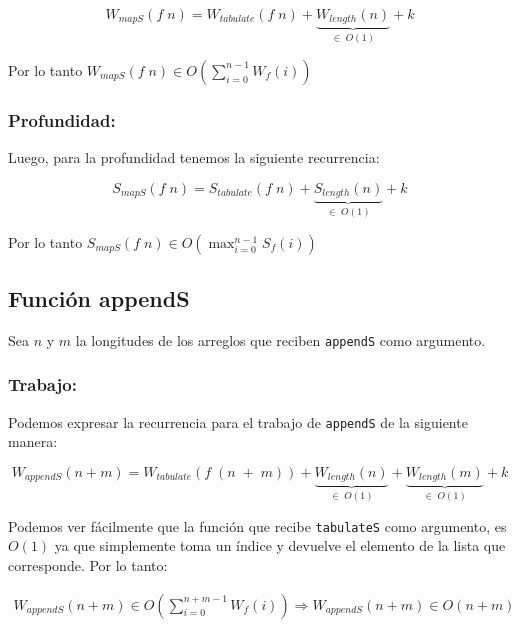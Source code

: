 \documentclass[11pt]{article}
\begin{document}
\begin{equation*}
    W_{mapS}(f \; n) = W_{tabulate}(f \; n) + \underbrace{W_{length}(n)}_{\in \; O(1)} + k
\end{equation*} 

Por lo tanto $ W_{mapS}(f \; n) \in O\left(\displaystyle\sum_{i=0}^{n - 1}W_f(i)\right) $

\subsubsection{Profundidad:}

Luego, para la profundidad tenemos la siguiente recurrencia:

\begin{equation*}
    S_{mapS}(f \; n) = S_{tabulate}(f \; n) + \underbrace{S_{length}(n)}_{\in \; O(1)} + k
\end{equation*} 

Por lo tanto $ S_{mapS}(f \; n) \in O\left(\displaystyle\max_{i=0}^{n - 1}S_f(i)\right) $


\subsection{Función appendS}
Sea $n$ y $m$ la longitudes de los arreglos que reciben \texttt{appendS} como
argumento. 
\subsubsection{Trabajo:}

Podemos expresar la recurrencia para el trabajo de \texttt{appendS} de 
la siguiente manera:

\begin{equation*}
    W_{appendS}(n + m) = W_{tabulate}(f \; (n \; +\; m)) + \underbrace{W_{length}(n)}_{\in \; O(1)}
    + \underbrace{W_{length}(m)}_{\in \; O(1)} + k
\end{equation*}

Podemos ver fácilmente que la función que recibe \texttt{tabulateS} como
argumento, es $O(1)$ ya que simplemente toma un índice y devuelve el 
elemento de la lista que corresponde. Por lo tanto:

\begin{align*}
    W_{appendS}(n + m) \in O\left(\displaystyle\sum_{i=0}^{n + m - 1}W_f(i)\right)
    \Rightarrow W_{appendS}(n + m) \in O(n + m)
\end{align*}
\end{document}
